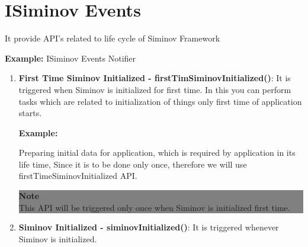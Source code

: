 \section{ISiminov Events} It provide API's related to life cycle of Siminov Framework

		\par
		\textbf{Example:} ISiminov Events Notifier
			


		\begin{enumerate}

			\item \small \textbf{First Time Siminov Initialized - firstTimSiminovInitialized()}: It is triggered when Siminov is initialized for first time. In this you can perform tasks which are related to initialization of things only first time of application starts.

					\par
					\textbf{Example:}
	
					\par
					 Preparing initial data for application, which is required by application in its life time, Since it is to be done only once, therefore we will use firstTimeSiminovInitialized API.
						
		
			
					\begin{center}
						\colorbox{grey}{
						\parbox[t]{.8\linewidth}{
							\fontsize{11pt}{11pt}\selectfont %
							\vspace*{0.1cm} %
		
							\hfill \textbf{Note} \\
							This API will be triggered only once when Siminov is initialized first time.
				
							\vspace*{0.0cm} %
						}
					}


					\end{center}


			\item \small \textbf{Siminov Initialized - siminovInitialized()}: It is triggered whenever Siminov is initialized. 


\end{enumerate}
